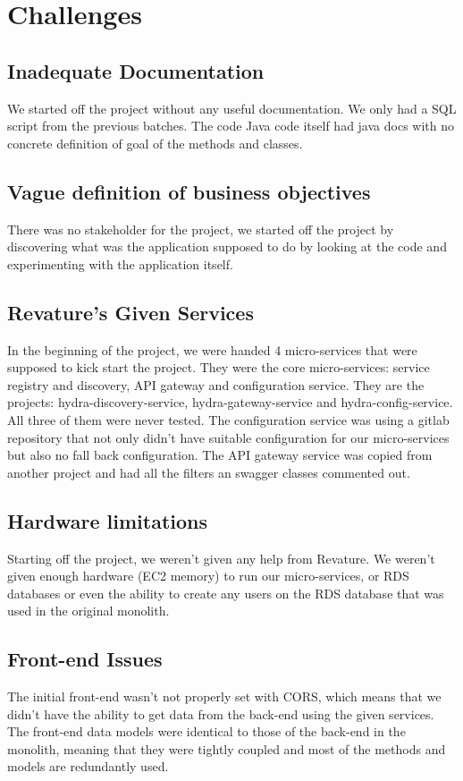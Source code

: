 \chapter{Challenges}
\section{Inadequate Documentation}
We started off the project without any useful documentation. We only had a SQL script from the previous batches. The code Java code itself had java docs with no concrete definition of goal of the methods and classes.
\section{Vague definition of business objectives}
There was no stakeholder for the project, we started off the project by discovering what was the application supposed to do by looking at the code and experimenting with the application itself.
\section{Revature's Given Services}
In the beginning of the project, we were handed 4 micro-services that were supposed to kick start the project. They were the core micro-services: service registry and discovery, API gateway and configuration service. They are the projects: hydra-discovery-service, hydra-gateway-service and hydra-config-service. All three of them were never tested. The configuration service was using a gitlab repository that not only didn't have suitable configuration for our micro-services but also no fall back configuration. The API gateway service was copied from another project and had all the filters an swagger classes commented out.
\section{Hardware limitations}
Starting off the project, we weren't given any help from Revature. We weren't given enough hardware (EC2 memory) to run our micro-services, or RDS databases or even the ability to create any users on the RDS database that was used in the original monolith.

\section{Front-end Issues}
The initial front-end wasn't not properly set with CORS, which means that we didn't have the ability to get data from the back-end using the given services. The front-end data models were identical to those of the back-end in the monolith, meaning that they were tightly coupled and most of the methods and models are redundantly used.